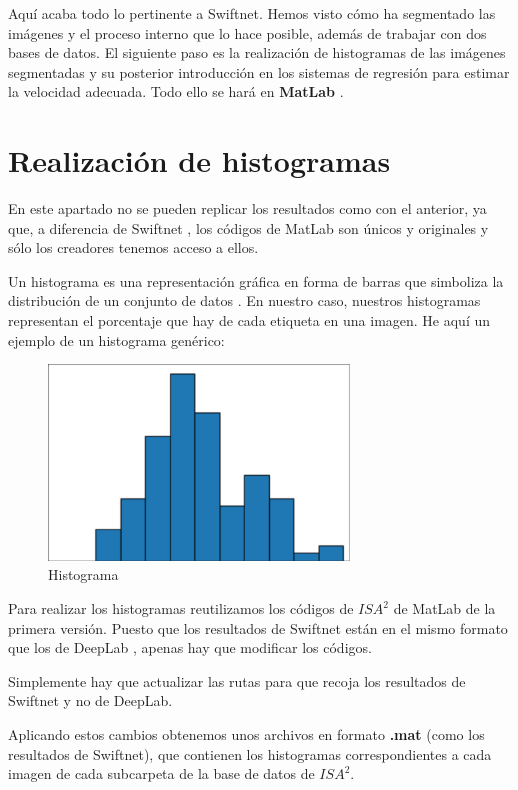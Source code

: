 Aquí acaba todo lo pertinente a Swiftnet. Hemos visto cómo ha segmentado las imágenes y el proceso interno que lo hace posible, además de trabajar con dos bases de datos. El siguiente paso es la realización de histogramas de las imágenes segmentadas y su posterior introducción en los sistemas de regresión para estimar la velocidad adecuada. Todo ello se hará en \textbf{MatLab} \cite{matlab}.

\section{Realización de histogramas}

En este apartado no se pueden replicar los resultados como con el anterior, ya que, a diferencia de Swiftnet \cite{swiftnet}, los códigos de MatLab \cite{matlab} son únicos y originales y sólo los creadores tenemos acceso a ellos.

Un histograma es una representación gráfica en forma de barras que simboliza la distribución de un conjunto de datos \cite{histograma}. En nuestro caso, nuestros histogramas representan el porcentaje que hay de cada etiqueta en una imagen. He aquí un ejemplo de un histograma genérico:

\begin{figure}[H]
  \centering
  \includegraphics[width=8cm]{Figuras/histograma.eps}
  \caption{Histograma}
\end{figure}

Para realizar los histogramas reutilizamos los códigos de $ISA^{2}$ \cite{isa2} de MatLab de la primera versión. Puesto que los resultados de Swiftnet están en el mismo formato que los de DeepLab \cite{deeplab}, apenas hay que modificar los códigos.

Simplemente hay que actualizar las rutas para que recoja los resultados de Swiftnet y no de DeepLab.

Aplicando estos cambios obtenemos unos archivos en formato \textbf{.mat} (como los resultados de Swiftnet), que contienen los histogramas correspondientes a cada imagen de cada subcarpeta de la base de datos de $ISA^{2}$.

